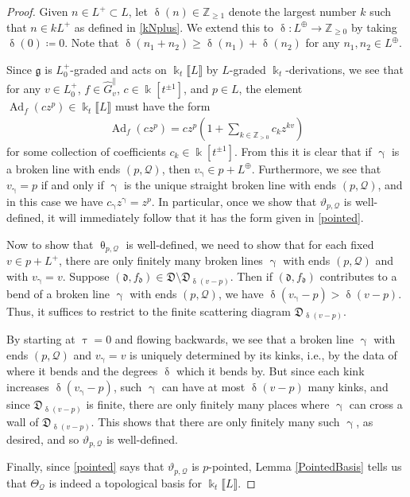 \documentclass{amsart}
\DeclareMathOperator{\Ad}{Ad}
\let\llb=\llbracket
\let\rrb=\rrbracket
\let\bb=\mathbb
\let\rar=\rightarrow
\let\f=\mathfrak
\newcommand {\kk} {\Bbbk}
\newcommand {\kt} {\kk_t}
\newcommand {\sQ} {\mathcal{Q}}
\renewcommand{\theta}{\uptheta}
\renewcommand{\gamma}{\upgamma}
\renewcommand{\delta}{\updelta}
\renewcommand{\tau}{\uptau}
\theoremstyle{plain}%
\theoremstyle{definition}
\theoremstyle{remark}
\begin{document}
\begin{proof}
Given $n\in L^{+}\subset L$, let $\delta(n)\in \bb{Z}_{\geq 1}$ denote the largest number $k$ such that $n\in kL^+$ as defined in \eqref{kNplus}.  We extend this to $\delta\colon L^{\oplus}\rar \bb{Z}_{\geq 0}$ by taking $\delta(0)\coloneqq 0$.  Note that $\delta(n_1+n_2)\geq \delta(n_1)+\delta(n_2)$ for any $n_1,n_2\in L^{\oplus}$. 


Since $\f{g}$ is $L_0^+$-graded and acts on $\kk_t\llb L\rrb$ by $L$-graded $\kt$-derivations, we see that for any $v\in L_0^+$, $f\in \hat{G}_v^{\parallel}$, $c\in \kk[t^{\pm 1}]$, and $p\in L$, the element $\Ad_f(cz^p)\in \kk_t\llb L\rrb$ must have the form
\begin{align*}
    \Ad_f(cz^p)=cz^p\left(1+\sum_{k\in \bb{Z}_{>0}}c_k z^{kv}\right)
\end{align*}
for some collection of coefficients $c_k\in \kk[t^{\pm 1}]$.  From this it is clear that if $\gamma$ is a broken line with ends $(p,\sQ)$, then $v_{\gamma}\in p+L^{\oplus}$.  Furthermore, we see that $v_{\gamma}=p$ if and only if $\gamma$ is the unique straight broken line with ends $(p,\sQ)$, and in this case we have $c_{\gamma}z^{\gamma}=z^p$.  In particular, once we show that $\vartheta_{p,\sQ}$ is well-defined, it will immediately follow that it has the form given in \eqref{pointed}.

Now to show that $\theta_{p,\sQ}$ is well-defined, we need to show that for each fixed $v\in p+L^+$, there are only finitely many broken lines $\gamma$ with ends $(p,\sQ)$ and with $v_{\gamma}=v$.  
Suppose $(\f{d},f_{\f{d}})\in \f{D}\setminus \f{D}_{\delta(v-p)}$.  Then if $(\f{d},f_{\f{d}})$ contributes to a bend of a broken line $\gamma$ with ends $(p,\sQ)$, we have $\delta(v_{\gamma}-p)>\delta(v-p)$.  Thus, it suffices to restrict to the finite scattering diagram $\f{D}_{\delta(v-p)}$.

By starting at $\tau=0$ and flowing backwards, we see that a broken line $\gamma$ with ends $(p,\sQ)$ and $v_{\gamma}=v$ is uniquely determined by its kinks, i.e., by the data of where it bends and the degrees $\delta$ which it bends by.  But since each kink increases $\delta(v_{\gamma}-p)$, such $\gamma$ can have at most $\delta(v-p)$ many kinks, and since $\f{D}_{\delta(v-p)}$ is finite, there are only finitely many places where $\gamma$ can cross a wall of $\f{D}_{\delta(v-p)}$.  This shows that there are only finitely many such $\gamma$, as desired, and so $\vartheta_{p,\sQ}$ is well-defined.


Finally, since \eqref{pointed} says that $\vartheta_{p,\sQ}$ is $p$-pointed, Lemma \ref{PointedBasis} tells us that $\Theta_{\sQ}$ is indeed a topological basis for $\kk_t\llb L\rrb$.
\end{proof}
\end{document}
